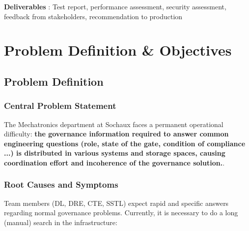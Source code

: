 \noindent\textbf{Deliverables} : Test report, performance assessment, security assessment, feedback from stakeholders, recommendation to production



\section{\textcolor[HTML]{0066CC}{Problem Definition \& Objectives}}
\label{sec:problem-objectives}

\subsection{\textcolor[HTML]{003D99}{Problem Definition}}
\label{subsec:problem-def}

\subsubsection*{\textcolor[HTML]{003D99}{Central Problem Statement}}

The Mechatronics department at Sochaux faces a permanent operational difficulty: \textbf{the governance information required to answer common engineering questions (role, state of the gate, condition of compliance ...) is distributed in various systems and storage spaces, causing coordination effort and incoherence of the governance solution.}.

\vspace{0.3cm}

\subsubsection*{\textcolor[HTML]{003D99}{Root Causes and Symptoms}}

Team members (DL, DRE, CTE, SSTL) expect rapid and specific answers regarding normal governance problems. Currently, it is necessary to do a long (manual) search in the infrastructure:

\vspace{0.2cm}


